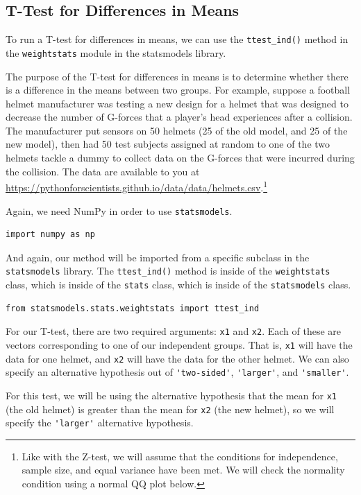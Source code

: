 \subsection{T-Test for Differences in Means}
To run a T-test for differences in means, we can use the \verb|ttest_ind()| method in the \verb|weightstats| module in the statsmodels library.\par
The purpose of the T-test for differences in means is to determine whether there is a difference in the means between two groups. For example, suppose a football helmet manufacturer was testing a new design for a helmet that was designed to decrease the number of G-forces that a player's head experiences after a collision. The manufacturer put sensors on 50 helmets (25 of the old model, and 25 of the new model), then had 50 test subjects assigned at random to one of the two helmets tackle a dummy to collect data on the G-forces that were incurred during the collision. The data are available to you at \\\href{https://pythonforscientists.github.io/data/data/helmets.csv}{https://pythonforscientists.github.io/data/data/helmets.csv}.\footnote{Like with the Z-test, we will assume that the conditions for independence, sample size, and equal variance have been met. We will check the normality condition using a normal QQ plot below.}\par
Again, we need NumPy in order to use \verb|statsmodels|.\par
\begin{lstlisting}[style=pippython]
import numpy as np
\end{lstlisting}
And again, our method will be imported from a specific subclass in the \verb|statsmodels| library. The \verb|ttest_ind()| method is inside of the \verb|weightstats| class, which is inside of the \verb|stats| class, which is inside of the \verb|statsmodels| class.
\begin{lstlisting}[style=pippython]
from statsmodels.stats.weightstats import ttest_ind
\end{lstlisting}
For our T-test, there are two required arguments: \verb|x1| and \verb|x2|. Each of these are vectors corresponding to one of our independent groups. That is, \verb|x1| will have the data for one helmet, and \verb|x2| will have the data for the other helmet. We can also specify an alternative hypothesis out of \verb|'two-sided'|, \verb|'larger'|, and \verb|'smaller'|.\par
For this test, we will be using the alternative hypothesis that the mean for \verb|x1| (the old helmet) is greater than the mean for \verb|x2| (the new helmet), so we will specify the \verb|'larger'| alternative hypothesis.\par
